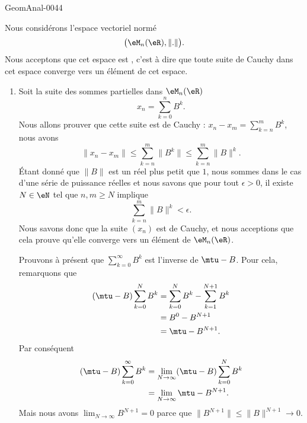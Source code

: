 \begin{corrige}{GeomAnal-0044}

    Nous considérons l'espace vectoriel normé
    \begin{equation}
        \big( \eM_n(\eR),\| . \| \big).
    \end{equation}
    Nous acceptons que cet espace est , c'est à dire que toute suite de Cauchy dans cet espace converge vers un élément de cet espace.

    \begin{enumerate}
        \item
            Soit la suite des sommes partielles dans \( \eM_n(\eR)\)
            \begin{equation}
                x_n=\sum_{k=0}^nB^k.
            \end{equation}
            Nous allons prouver que cette suite est de Cauchy : \( x_n-x_m=\sum_{k=n}^{m}B^k\), nous avons
            \begin{equation}
                \| x_n-x_m \|\leq\sum_{k=n}^m\| B^k \|\leq \sum_{k=n}^m\| B \|^k.
            \end{equation}
            Étant donné que \( \| B \|\) est un réel plus petit que \( 1\), nous sommes dans le cas d'une série de puissance réelles et nous savons que pour tout \( \epsilon>0\), il existe \( N\in\eN\) tel que \( n,m\geq N\) implique
            \begin{equation}
                \sum_{k=n}^m\| B \|^k<\epsilon.
            \end{equation}
            Nous savons donc que la suite \( (x_n)\) est de Cauchy, et nous acceptions que cela prouve qu'elle converge vers un élément de \( \eM_n(\eR)\).

            Prouvons à présent que \( \sum_{k=0}^{\infty}B^k\) est l'inverse de \( \mtu-B\). Pour cela, remarquons que
            \begin{subequations}
                \begin{align}
                    (\mtu-B)\sum_{k=0}^NB^k&=\sum_{k=0}^NB^k-\sum_{k=1}^{N+1}B^k\\
                    &=B^0-B^{N+1}\\
                    &=\mtu-B^{N+1}.
                \end{align}
            \end{subequations}
            Par conséquent
            \begin{equation}
                \begin{aligned}[]
                    (\mtu-B)\sum_{k=0}^{\infty}B^k&=\lim_{N\to\infty}(\mtu-B)\sum_{k=0}^NB^k\\
                    &=\lim_{N\to\infty}\mtu-B^{N+1}.
                \end{aligned}
            \end{equation}
            Mais nous avons \( \lim_{N\to\infty}B^{N+1}=0\) parce que \( \| B^{N+1} \|\leq \| B \|^{N+1}\to 0\).


\end{enumerate}
\end{corrige}
